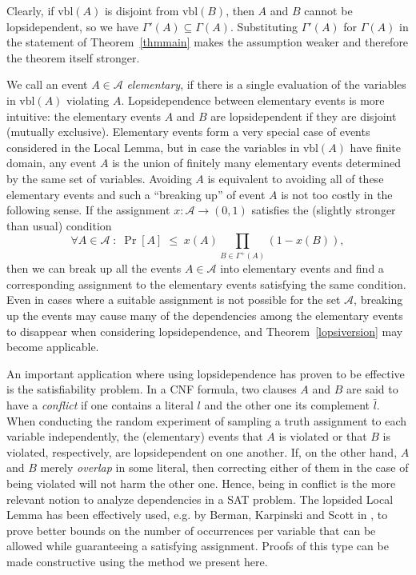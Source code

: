 \documentclass[11pt,a4paper]{article}
\DeclareMathOperator*{\pr}{Pr}
\begin{document}
Clearly, if $\mbox{vbl}(A)$ is disjoint from
$\mbox{vbl}(B)$, then $A$ and $B$ cannot be lopsidependent, so we have
$\Gamma'(A)\subseteq\Gamma(A)$. Substituting $\Gamma'(A)$ for $\Gamma(A)$ in
the statement of Theorem~\ref{thmmain} makes the assumption weaker and
therefore the theorem itself stronger.

We call an event $A\in\mathcal{A}$ {\em elementary}, if there is a single
evaluation of the variables in $\mbox{vbl}(A)$ violating $A$. Lopsidependence
between elementary events is more intuitive: the elementary events $A$ and
$B$ are lopsidependent if they are disjoint (mutually exclusive). Elementary
events form a very special case of events considered in the Local Lemma, but
in case the variables in $\mbox{vbl}(A)$ have finite domain, any event $A$
is the union of finitely many elementary events determined by the same set of
variables. Avoiding $A$ is equivalent to avoiding all of these elementary
events and such a ``breaking up'' of event $A$ is not too costly in the
following sense. If the assignment $x:\mathcal{A}\to(0,1)$ satisfies the
(slightly stronger than usual) condition
$$ \forall A \in \mathcal{A} \; : \; \pr[A] \; \le \; x(A) \prod_{B \in
\Gamma^+(A)} (1 - x(B)),$$
then we can break up all the events $A\in\mathcal{A}$ into elementary events and
find a corresponding assignment to the elementary events satisfying the same
condition. Even in cases where a suitable assignment is not possible for the set
$\mathcal{A}$, breaking up the events may cause many of the dependencies
among the elementary events to disappear when considering lopsidependence, and
Theorem~\ref{lopsiversion} may become applicable.

An important application where using lopsidependence has proven to be effective is
the satisfiability problem. In a CNF formula, two clauses $A$ and $B$ are said to have a
\emph{conflict} if one contains a literal $l$ and the other one its complement $\bar l$.
When conducting the random experiment of sampling a truth assignment to each variable
independently, the (elementary) events that $A$ is violated or that $B$ is violated,
respectively, are lopsidependent on one another. If, on the other hand, $A$ and $B$
merely \emph{overlap} in some literal, then correcting either of them in the case of
being violated will not harm the other one. Hence, being in conflict is the more relevant
notion to analyze dependencies in a SAT problem. The lopsided Local Lemma has been
effectively used, e.g. by Berman, Karpinski and Scott in \cite{BKS03}, to prove better
bounds on the number of occurrences per variable that can be allowed while guaranteeing 
a satisfying assignment. Proofs of this type can be made constructive using the method we 
present here.
\end{document}
